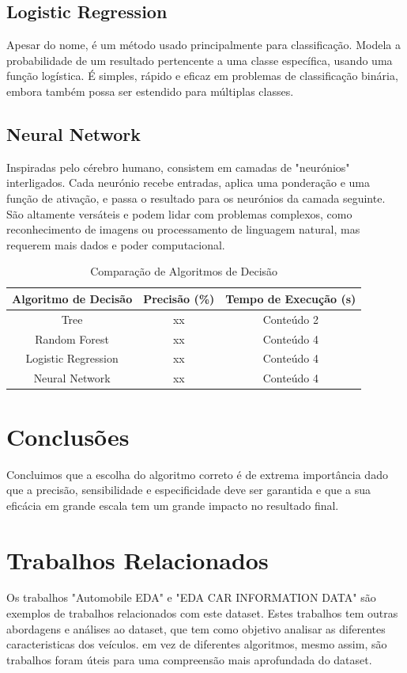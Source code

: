 \documentclass[conference]{IEEEtran}
\begin{document}
\subsection{Logistic Regression}
Apesar do nome, é um método usado principalmente para classificação. Modela a probabilidade de um resultado pertencente a 
uma classe específica, usando uma função logística. É simples, rápido e eficaz em problemas de classificação binária, 
embora também possa ser estendido para múltiplas classes.

\subsection{Neural Network}
Inspiradas pelo cérebro humano, consistem em camadas de "neurónios" interligados. Cada neurónio recebe entradas, 
aplica uma ponderação e uma função de ativação, e passa o resultado para os neurónios da camada seguinte. São altamente versáteis 
e podem lidar com problemas complexos, como reconhecimento de imagens ou processamento de linguagem natural, mas requerem mais dados 
e poder computacional.

\newpage
\begin{table}[h!]
\caption{Comparação de Algoritmos de Decisão}
\centering
\begin{tabular}{|c|c|c|}
\hline
\textbf{Algoritmo de Decisão} & \textbf{Precisão (\%)} & \textbf{Tempo de Execução (s)}\\
\hline
Tree & xx & Conteúdo 2 \\
\hline
Random Forest & xx & Conteúdo 4 \\
\hline
Logistic Regression & xx & Conteúdo 4 \\
\hline
Neural Network & xx & Conteúdo 4 \\
\hline
\end{tabular}
\end{table}

\section{Conclusões}
Concluimos que a escolha do algoritmo correto é de extrema importância dado que a precisão, sensibilidade e especificidade
deve ser garantida e que a sua eficácia em grande escala tem um grande impacto no resultado final.

\section*{Trabalhos Relacionados}
Os trabalhos "Automobile EDA" \cite{ref2} e "EDA CAR INFORMATION DATA" \cite{ref3} são exemplos de trabalhos relacionados com este dataset.
Estes trabalhos tem outras abordagens e análises ao dataset, que tem como objetivo analisar as diferentes caracteristicas dos veículos.
 em vez de diferentes algoritmos, mesmo assim, são trabalhos foram úteis para uma compreensão mais aprofundada do dataset.
\end{document}

